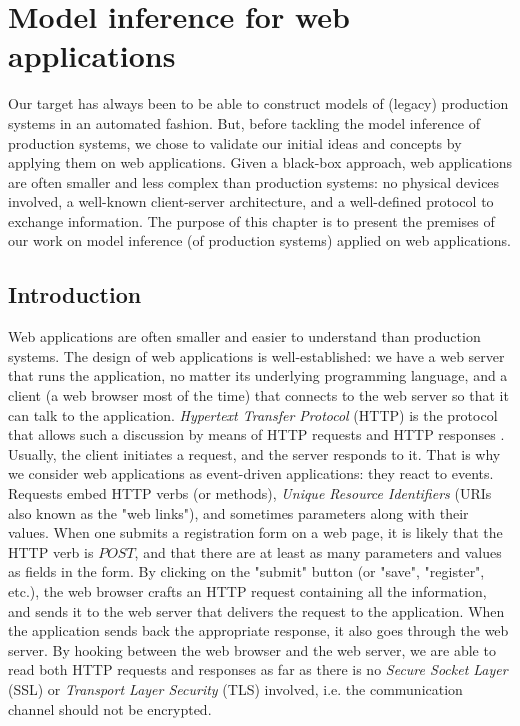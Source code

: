 \chapter{Model inference for web applications}
\label{sec:modelinf:webapps}

Our target has always been to be able to construct models of
(legacy) production systems in an automated fashion. But, before
tackling the model inference of production systems, we chose to
validate our initial ideas and concepts by applying them on web
applications. Given a black-box approach, web applications are
often smaller and less complex than production systems: no
physical devices involved, a well-known client-server
architecture, and a well-defined protocol to exchange
information. The purpose of this chapter is to present the
premises of our work on model inference (of production systems)
applied on web applications.\\

\minitoc

\section{Introduction}

Web applications are often smaller and easier to understand than
production systems. The design of web applications is
well-established: we have a web server that runs the application,
no matter its underlying programming language, and a client (a
web browser most of the time) that connects to the web server so
that it can talk to the application. \textit{Hypertext Transfer
Protocol} (HTTP)  is the protocol that allows such a discussion by
means of HTTP requests and HTTP responses \cite{RFC7230}.
Usually, the client initiates a request, and the server responds
to it. That is why we consider web applications as event-driven
applications: they react to events. Requests embed HTTP verbs (or
methods), \textit{Unique Resource Identifiers} (URIs also known
as the "web links"), and sometimes parameters along with their
values. When one submits a registration form on a web page, it is
likely that the HTTP verb is $POST$, and that there are at least
as many parameters and values as fields in the form. By clicking
on the "submit" button (or "save", "register", etc.), the web
browser crafts an HTTP request containing all the information,
and sends it to the web server that delivers the request to the
application. When the application sends back the appropriate
response, it also goes through the web server. By hooking between
the web browser and the web server, we are able to read both HTTP
requests and responses as far as there is no \textit{Secure
Socket Layer} (SSL) or \textit{Transport Layer Security} (TLS)
involved, i.e. the communication channel should not be encrypted.

